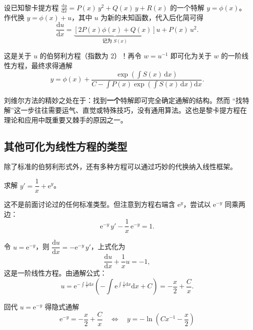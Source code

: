 \documentclass[lang=cn,11pt]{elegantbook}
\begin{document}
\begin{theorem}[黎卡提方程的刘维尔解法] \label{thm:riccati-liouville}
设已知黎卡提方程 $\frac{\mathrm{d}y}{\mathrm{d}x}=P(x)\,y^{2}+Q(x)\,y+R(x) $ 的一个特解 $y=\phi(x)$。作代换 $y=\phi(x)+u$，其中 $u$ 为新的未知函数，代入后化简可得
\[
\frac{\mathrm{d}u}{\mathrm{d}x}=\underbrace{[2P(x)\phi(x)+Q(x)]}_{\text{记为 }S(x)}u+P(x)\,u^{2}.
\]

这是关于 $u$ 的伯努利方程（指数为 2）！再令 $w=u^{-1}$ 即可化为关于 $w$ 的一阶线性方程，最终求得通解
\[
\boxed{y=\phi(x)+\frac{\exp\!\left(\displaystyle\int S(x)\,\mathrm{d}x\right)}{C-\displaystyle\int P(x)\exp\!\left(\int S(x)\,\mathrm{d}x\right)\mathrm{d}x}}.
\]
\end{theorem}

\begin{remark}
刘维尔方法的精妙之处在于：找到\textbf{一个}特解即可完全确定通解的结构。然而 ``找特解''这一步往往需要运气、直觉或特殊技巧，没有通用算法。这也是黎卡提方程在理论和应用中既重要又棘手的原因之一。
\end{remark}

\subsection{其他可化为线性方程的类型}

除了标准的伯努利形式外，还有多种方程可以通过巧妙的代换纳入线性框架。

\begin{exercise}
求解 $y'=\dfrac{1}{x}+\mathrm{e}^{y}$。
\end{exercise}
\begin{solution}
这不是前面讨论过的任何标准类型。但注意到方程右端含 $\mathrm{e}^{y}$，尝试以 $\mathrm{e}^{-y}$ 同乘两边：
\[
\mathrm{e}^{-y}\,y'-\frac{1}{x}\,\mathrm{e}^{-y}=1.
\]

令 $u=\mathrm{e}^{-y}$，则 $\dfrac{\mathrm{d}u}{\mathrm{d}x}=-\mathrm{e}^{-y}\,y'$，上式化为
\[
\frac{\mathrm{d}u}{\mathrm{d}x}+\frac{1}{x}u=-1,
\]
这是一阶线性方程。由通解公式：
\[
u=\mathrm{e}^{-\int\frac{1}{x}\mathrm{d}x}\!\left(-\int\mathrm{e}^{\int\frac{1}{x}\mathrm{d}x}\mathrm{d}x+C\right)
=-\frac{x}{2}+\frac{C}{x}.
\]

回代 $u=\mathrm{e}^{-y}$ 得隐式通解
\[
\boxed{\mathrm{e}^{-y}=-\frac{x}{2}+\frac{C}{x}}
\quad\Longleftrightarrow\quad
\boxed{y=-\ln\!\left(Cx^{-1}-\frac{x}{2}\right)}
\]
\end{solution}
\end{document}
